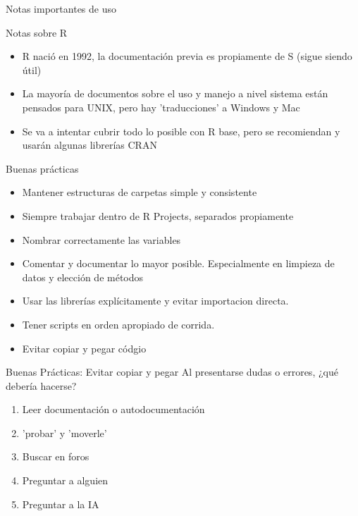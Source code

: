 \documentclass[aspectratio=169,xcolor=dvipsnames]{beamer}
\begin{document}
\begin{section}{Notas importantes de uso}  
    
\begin{frame}{Notas sobre R}
    \begin{itemize}
        \item R nació en 1992, la documentación previa es propiamente de S (sigue siendo útil)
        \item La mayoría de documentos sobre el uso y manejo a nivel sistema están pensados para UNIX, pero hay 'traducciones' a Windows y Mac
        \item Se va a intentar cubrir todo lo posible con R base, pero se recomiendan y usarán algunas librerías CRAN
    \end{itemize}
\end{frame}

\begin{frame}{Buenas prácticas}
    \begin{itemize}
        \item Mantener estructuras de carpetas simple y consistente
        \item Siempre trabajar dentro de R Projects, separados propiamente
        \item Nombrar correctamente las variables
        \item Comentar y documentar lo mayor posible. Especialmente en limpieza de datos y elección de métodos
        \item Usar las librerías explícitamente y evitar importacion directa.
        \item Tener scripts en orden apropiado de corrida.
        \item Evitar copiar y pegar códgio
    \end{itemize}
\end{frame}

\begin{frame}{Buenas Prácticas: Evitar copiar y pegar}
    Al presentarse dudas o errores, ¿qué debería hacerse?
    \begin{enumerate}
        \item Leer documentación o autodocumentación
        \item 'probar' y 'moverle'
        \item Buscar en foros
        \item Preguntar a alguien
        \item Preguntar a la IA
    \end{enumerate}
\end{frame}
\end{section}
\end{document}
